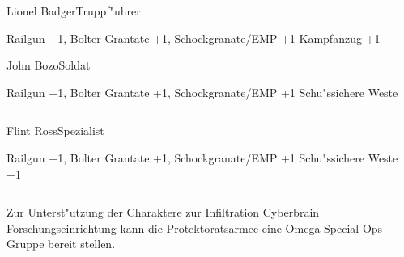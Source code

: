 \begin{column}[l]{0.45}
    \begin{nscsheet}[h]{Lionel Badger\newline{}Truppf"uhrer}
        \nscstats[ATT=2,AGG=2]
        \nscruler
        \begin{nscinventory}
            \nscitem[Waffen] Railgun +1, Bolter
            \nscitem[Granaten] Grantate +1, Schockgranate/EMP +1
            \nscitem[R"ustung] Kampfanzug +1
        \end{nscinventory}
    \end{nscsheet}

    \begin{nscsheet}[h]{John Bozo\newline{}Soldat}
        \nscstats[ATT=2,AGG=2]
        \nscruler
        \begin{nscinventory}
            \nscitem[Waffen] Railgun +1, Bolter
            \nscitem[Granaten] Grantate +1, Schockgranate/EMP +1
            \nscitem[R"ustung] Schu"ssichere Weste
        \end{nscinventory}
    \end{nscsheet}
\end{column}
\begin{column}[r]{0.45}
    \begin{nscsheet}[h]{Flint Ross\newline{}Spezialist}
        \nscstats[ATT=2,AGG=1,DEX=3]
        \nscruler
        \begin{nscinventory}
            \nscitem[Waffen] Railgun +1, Bolter
            \nscitem[Granaten] Grantate +1, Schockgranate/EMP +1
            \nscitem[R"ustung] Schu"ssichere Weste +1
        \end{nscinventory}
    \end{nscsheet}
\end{column}


Zur Unterst"utzung der Charaktere zur Infiltration  Cyberbrain Forschungseinrichtung kann die Protektoratsarmee eine 
Omega Special Ops Gruppe bereit stellen.

